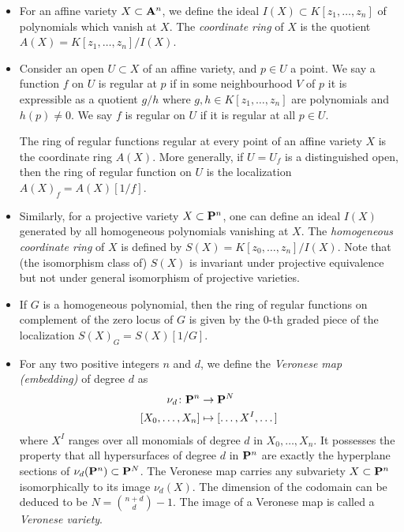 \begin{itemize}
\item
  For an affine variety $X \subset \A^n$, we define the ideal $I(X) \subset K[z_1, \dots, z_n]$ of polynomials which vanish at $X$. The \emph{coordinate ring} of $X$ is the quotient $A(X) = K[z_1,\dots,z_n]/I(X)$.
\item
  Consider an open $U \subset X$ of an affine variety, and $p \in U$ a point. We say a function $f$ on $U$ is regular at $p$ if in some neighbourhood $V$ of $p$ it is expressible as a quotient $g/h$ where $g,h \in K[z_1, \dots, z_n]$ are polynomials and $h(p) \neq 0$. We say $f$ is regular on $U$ if it is regular at all $p \in U$.

  \begin{lemma}
    The ring of regular functions regular at every point of an affine variety $X$ is the coordinate ring $A(X)$. More generally, if $U = U_f$ is a distinguished open, then the ring of regular function on $U$ is the localization $A(X)_f = A(X)[1/f]$.
  \end{lemma}

\item
  Similarly, for a projective variety $X \subset \P^n$, one can define an ideal $I(X)$ generated by all homogeneous polynomials vanishing at $X$. The \emph{homogeneous coordinate ring} of $X$ is defined by $S(X) = K[z_0,\dots,z_n]/I(X)$. Note that (the isomorphism class of) $S(X)$ is invariant under projective equivalence but not under general isomorphism of projective varieties.

\item
  If $G$ is a homogeneous polynomial, then the ring of regular functions on complement of the zero locus of $G$ is given by the $0$-th graded piece of the localization $S(X)_G = S(X)[1/G]$.

\item
  For any two positive integers $n$ and $d$, we define the \emph{Veronese map (embedding)} of degree $d$ as
  \begin{align*}
    \nu_d \cn \P^n &\rarr \P^N \\
    [X_0, \dots, X_n] &\mapsto [ \dots, X^I, \dots ]
  \end{align*}
  where $X^I$ ranges over all monomials of degree $d$ in $X_0, \dots, X_n$. It possesses the property that all hypersurfaces of degree $d$ in $\P^n$ are exactly the hyperplane sections of $\nu_d(\P^n) \subset \P^N$. The Veronese map carries any subvariety $X \subset \P^n$ isomorphically to its image $\nu_d(X)$. The dimension of the codomain can be deduced to be $N = \binom{n+d}{d}-1$. The image of a Veronese map is called a \emph{Veronese variety}.


\end{itemize}
